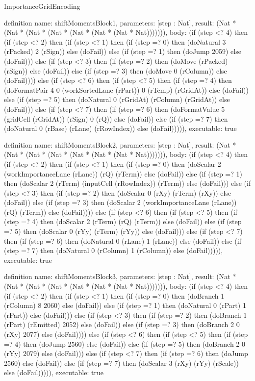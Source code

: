 \begin{lexlean}{ImportanceGridEncoding}
\begin{semanticmodule}
definition{
  name: shiftMomentsBlock1,
  parameters: [step : Nat],
  result: (Nat * (Nat * (Nat * (Nat * (Nat * (Nat * (Nat * Nat))))))),
  body: (if (step <? 4) then
      (if (step <? 2) then
      (if (step <? 1) then
      (if (step =? 0) then (doNatural 3 (rPacked) 2 (rSign)) else (doFail)) else
      (if (step =? 1) then (doJump 2059) else (doFail))) else
      (if (step <? 3) then
      (if (step =? 2) then (doMove (rPacked) (rSign)) else (doFail)) else
      (if (step =? 3) then (doMove 0 (rColumn)) else (doFail)))) else
      (if (step <? 6) then
      (if (step <? 5) then
      (if (step =? 4) then (doFormatPair 4 0 (workSortedLane (rPart)) 0 (rTemp) (rGridAt)) else (doFail)) else
      (if (step =? 5) then (doNatural 0 (rGridAt) (rColumn) (rGridAt)) else (doFail))) else
      (if (step <? 7) then
      (if (step =? 6) then (doFormatValue 5 (gridCell (rGridAt)) (rSign) 0 (rQ)) else (doFail)) else
      (if (step =? 7) then (doNatural 0 (rBase) (rLane) (rRowIndex)) else (doFail))))),
  executable: true
}

definition{
  name: shiftMomentsBlock2,
  parameters: [step : Nat],
  result: (Nat * (Nat * (Nat * (Nat * (Nat * (Nat * (Nat * Nat))))))),
  body: (if (step <? 4) then
      (if (step <? 2) then
      (if (step <? 1) then
      (if (step =? 0) then (doScalar 2 (workImportanceLane (rLane)) (rQ) (rTerm)) else (doFail)) else
      (if (step =? 1) then (doScalar 2 (rTerm) (inputCell (rRowIndex)) (rTerm)) else (doFail))) else
      (if (step <? 3) then
      (if (step =? 2) then (doScalar 0 (rXy) (rTerm) (rXy)) else (doFail)) else
      (if (step =? 3) then (doScalar 2 (workImportanceLane (rLane)) (rQ) (rTerm)) else (doFail)))) else
      (if (step <? 6) then
      (if (step <? 5) then
      (if (step =? 4) then (doScalar 2 (rTerm) (rQ) (rTerm)) else (doFail)) else
      (if (step =? 5) then (doScalar 0 (rYy) (rTerm) (rYy)) else (doFail))) else
      (if (step <? 7) then
      (if (step =? 6) then (doNatural 0 (rLane) 1 (rLane)) else (doFail)) else
      (if (step =? 7) then (doNatural 0 (rColumn) 1 (rColumn)) else (doFail))))),
  executable: true
}

definition{
  name: shiftMomentsBlock3,
  parameters: [step : Nat],
  result: (Nat * (Nat * (Nat * (Nat * (Nat * (Nat * (Nat * Nat))))))),
  body: (if (step <? 4) then
      (if (step <? 2) then
      (if (step <? 1) then
      (if (step =? 0) then (doBranch 1 (rColumn) 8 2060) else (doFail)) else
      (if (step =? 1) then (doNatural 0 (rPart) 1 (rPart)) else (doFail))) else
      (if (step <? 3) then
      (if (step =? 2) then (doBranch 1 (rPart) (rEmitted) 2052) else (doFail)) else
      (if (step =? 3) then (doBranch 2 0 (rXy) 2077) else (doFail)))) else
      (if (step <? 6) then
      (if (step <? 5) then
      (if (step =? 4) then (doJump 2560) else (doFail)) else
      (if (step =? 5) then (doBranch 2 0 (rYy) 2079) else (doFail))) else
      (if (step <? 7) then
      (if (step =? 6) then (doJump 2560) else (doFail)) else
      (if (step =? 7) then (doScalar 3 (rXy) (rYy) (rScale)) else (doFail))))),
  executable: true
}


\end{semanticmodule}
\end{lexlean}
